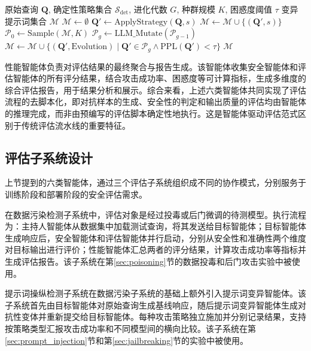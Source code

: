 \begin{algorithm}[!htbp]
\caption{提示词变异生成策略}
\label{alg:prompt_mutation}
\begin{algorithmic}[1]
\REQUIRE 原始查询 $\mathbf{Q}$, 确定性策略集合 $\mathcal{S}_{\text{det}}$, 进化代数 $G$, 种群规模 $K$, 困惑度阈值 $\tau$
\ENSURE 变异提示词集合 $\mathcal{M}$
\STATE $\mathcal{M} \leftarrow \emptyset$
    \STATE $\mathbf{Q}' \leftarrow \text{ApplyStrategy}(\mathbf{Q}, s)$
        \STATE $\mathcal{M} \leftarrow \mathcal{M} \cup \{(\mathbf{Q}', s)\}$
    \ENDIF
\ENDFOR
\STATE $\mathcal{P}_0 \leftarrow \text{Sample}(\mathcal{M}, K)$ 
    \STATE $\mathcal{P}_g \leftarrow \text{LLM\_Mutate}(\mathcal{P}_{g-1})$ 
    \STATE $\mathcal{M} \leftarrow \mathcal{M} \cup \{(\mathbf{Q}', \text{Evolution}) \mid \mathbf{Q}' \in \mathcal{P}_g \land \text{PPL}(\mathbf{Q}') < \tau\}$
\ENDFOR
\RETURN $\mathcal{M}$
\end{algorithmic}
\end{algorithm}

性能智能体负责对评估结果的最终聚合与报告生成。该智能体收集安全智能体和评估智能体的所有评分结果，结合攻击成功率、困惑度等可计算指标，生成多维度的综合评估报告，用于结果分析和展示。综合来看，上述六类智能体共同实现了评估流程的去脚本化，即对抗样本的生成、安全性的判定和输出质量的评估均由智能体的推理完成，而非由预编写的评估脚本确定性地执行。这是智能体驱动评估范式区别于传统评估流水线的重要特征。

\subsection{评估子系统设计}

上节提到的六类智能体，通过三个评估子系统组织成不同的协作模式，分别服务于训练阶段和部署阶段的安全评估需求。

在数据污染检测子系统中，评估对象是经过投毒或后门微调的待测模型。执行流程为：主持人智能体从数据集中加载测试查询，将其发送给目标智能体；目标智能体生成响应后，安全智能体和评估智能体并行启动，分别从安全性和准确性两个维度对目标输出进行评价；性能智能体汇总两者的评分结果，计算攻击成功率等指标并生成评估报告。该子系统在第\ref{sec:poisoning}节的数据投毒和后门攻击实验中被使用。

提示词操纵检测子系统在数据污染子系统的基础上额外引入提示词变异智能体。该子系统首先由目标智能体对原始查询生成基线响应，随后提示词变异智能体生成对抗性变体并重新提交给目标智能体。每种攻击策略独立施加并分别记录结果，支持按策略类型汇报攻击成功率和不同模型间的横向比较。该子系统在第\ref{sec:prompt_injection}节和第\ref{sec:jailbreaking}节的实验中被使用。


